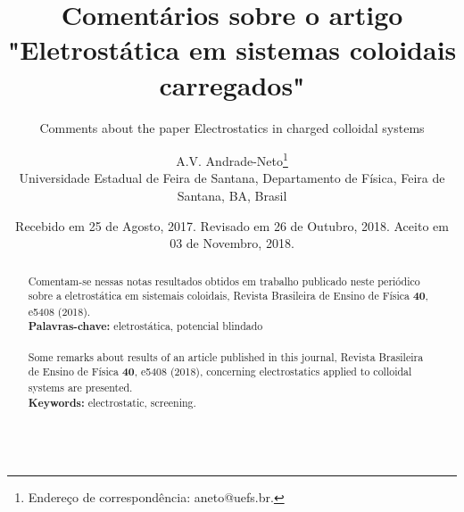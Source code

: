 \documentclass[brazilian,12pt,a4paper,final]{article}
\title{Comentários sobre o artigo "Eletrostática em sistemas coloidais carregados"}
\subtitle{Comments about the paper Electrostatics in charged colloidal systems}
\author{A.V. Andrade-Neto\footnote{Endereço de correspondência: aneto@uefs.br.}\\ {\small Universidade Estadual de Feira de Santana, Departamento de Física, Feira de Santana, BA, Brasil}}
\date{Recebido em 25 de Agosto, 2017. Revisado em 26 de Outubro, 2018. Aceito em 03 de Novembro, 2018.}
\begin{document}
\maketitle
\begin{abstract}
Comentam-se nessas notas resultados obtidos em trabalho publicado neste periódico sobre a eletrostática em
sistemais coloidais, Revista Brasileira de Ensino de Física \textbf{40}, e5408 (2018).\\
\textbf{Palavras-chave:} eletrostática, potencial blindado\\
\\
Some remarks about results of an article published in this journal, Revista Brasileira de Ensino de Física \textbf{40},
e5408 (2018), concerning electrostatics applied to colloidal systems are presented.\\
\textbf{Keywords:} electrostatic, screening.\\
\\
\end{abstract}
\end{document}
